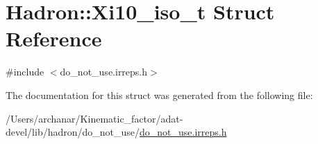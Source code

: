 \hypertarget{structHadron_1_1Xi10__iso__t}{}\section{Hadron\+:\+:Xi10\+\_\+iso\+\_\+t Struct Reference}
\label{structHadron_1_1Xi10__iso__t}


{\ttfamily \#include $<$do\+\_\+not\+\_\+use.\+irreps.\+h$>$}



The documentation for this struct was generated from the following file\+:\begin{DoxyCompactItemize}
\item 
/\+Users/archanar/\+Kinematic\+\_\+factor/adat-\/devel/lib/hadron/do\+\_\+not\+\_\+use/\mbox{\hyperlink{adat-devel_2lib_2hadron_2do__not__use_2do__not__use_8irreps_8h}{do\+\_\+not\+\_\+use.\+irreps.\+h}}\end{DoxyCompactItemize}
